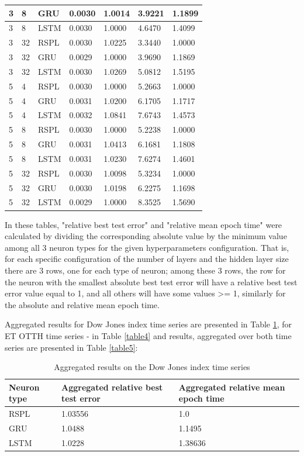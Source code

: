 \documentclass[sn-apa]{sn-jnl}%
\begin{document}
\begin{table}[H]
\begin{tabular}{|p{1.4cm}|p{1.4cm}|p{1.4cm}|p{1.5cm}|p{2.5cm}|p{1.9cm}|p{2cm}|}
\hline
3 &   8 &   GRU & 0.0030 & 1.0014 & 3.9221 &  1.1899 \\
\hline
3 &   8 &  LSTM & 0.0030 & 1.0000 & 4.6470 &  1.4099 \\
\hline
3 &  32 &   RSPL & 0.0030 & 1.0225 & 3.3440 &  1.0000 \\
\hline
3 &  32 &   GRU & 0.0029 & 1.0000 & 3.9690 &  1.1869 \\
\hline
3 &  32 &  LSTM & 0.0030 & 1.0269 & 5.0812 &  1.5195 \\
\hline
5 &   4 &   RSPL & 0.0030 & 1.0000 & 5.2663 &  1.0000 \\
\hline
5 &   4 &   GRU & 0.0031 & 1.0200 & 6.1705 &  1.1717 \\
\hline
5 &   4 &  LSTM & 0.0032 & 1.0841 & 7.6743 &  1.4573 \\
\hline
5 &   8 &   RSPL & 0.0030 & 1.0000 & 5.2238 &  1.0000 \\
\hline
5 &   8 &   GRU & 0.0031 & 1.0413 & 6.1681 &  1.1808 \\
\hline
5 &   8 &  LSTM & 0.0031 & 1.0230 & 7.6274 &  1.4601 \\
\hline
5 &  32 &   RSPL & 0.0030 & 1.0098 & 5.3234 &  1.0000 \\
\hline
5 &  32 &   GRU & 0.0030 & 1.0198 & 6.2275 &  1.1698 \\
\hline
5 &  32 &  LSTM & 0.0029 & 1.0000 & 8.3525 &  1.5690 \\
\hline
\end{tabular}
\end{table}

In these tables, "relative best test error" and "relative mean epoch time" were calculated by dividing the corresponding absolute value by the minimum value among all 3 neuron types for the given hyperparameters configuration. That is, for each specific configuration of the number of layers and the hidden layer size there are 3 rows, one for each type of neuron; among these 3 rows, the row for the neuron with the smallest absolute best test error will have a relative best test error value equal to 1, and all others will have some values >= 1, similarly for the absolute and relative mean epoch time. 

Aggregated results for Dow Jones index time series are presented in Table \ref{table3}, for ET OTTH time series - in Table \ref{table4} and results, aggregated over both time series are presented in Table \ref{table5}:

\begin{table}[H]
\caption{Aggregated results on the Dow Jones index time series}\label{table3}
\begin{tabular}{ |p{2.2cm}|p{5cm}|p{5cm}| }
 \hline
  Neuron type & Aggregated relative best test error & Aggregated relative mean epoch time \\
  \hline
 RSPL & 1.03556 & 1.0 \\
 \hline  
 GRU & 1.0488 & 1.1495 \\
 \hline 
 LSTM & 1.0228 & 1.38636 \\
 \hline
\end{tabular}
\end{table}
\end{document}
